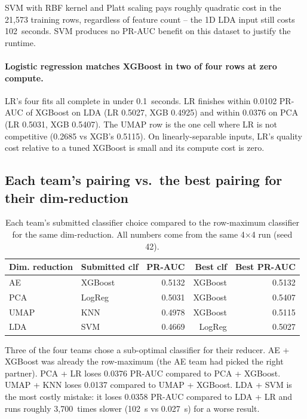 \documentclass[12pt,a4paper]{article}
\begin{document}
SVM with RBF kernel and Platt scaling pays roughly quadratic cost in the
21{,}573 training rows, regardless of feature count -- the 1D LDA input
still costs 102~seconds. SVM produces no PR-AUC benefit on this dataset to
justify the runtime.

\paragraph{Logistic regression matches XGBoost in two of four rows at zero compute.}
LR's four fits all complete in under 0.1~seconds. LR finishes within 0.0102
PR-AUC of XGBoost on LDA (LR 0.5027, XGB 0.4925) and within 0.0376 on PCA
(LR 0.5031, XGB 0.5407). The UMAP row is the one cell where LR is not
competitive (0.2685 vs XGB's 0.5115). On linearly-separable inputs, LR's
quality cost relative to a tuned XGBoost is small and its compute cost is
zero.

\subsection{Each team's pairing vs.\ the best pairing for their dim-reduction}

\begin{table}[H]
\centering
\caption{Each team's submitted classifier choice compared to the
         row-maximum classifier for the same dim-reduction. All numbers
         come from the same 4$\times$4 run (seed 42).}
\label{tab:team_pairings}
\small
\begin{tabular}{llrrr}
\toprule
Dim. reduction & Submitted clf & PR-AUC & Best clf & Best PR-AUC \\
\midrule
AE   & XGBoost & 0.5132 & XGBoost & 0.5132 \\
PCA  & LogReg  & 0.5031 & XGBoost & 0.5407 \\
UMAP & KNN     & 0.4978 & XGBoost & 0.5115 \\
LDA  & SVM     & 0.4669 & LogReg  & 0.5027 \\
\bottomrule
\end{tabular}
\end{table}

Three of the four teams chose a sub-optimal classifier for their reducer.
AE + XGBoost was already the row-maximum (the AE team had picked the right
partner). PCA + LR loses 0.0376 PR-AUC compared to PCA + XGBoost. UMAP +
KNN loses 0.0137 compared to UMAP + XGBoost. LDA + SVM is the most
costly mistake: it loses 0.0358 PR-AUC compared to LDA + LR and runs
roughly 3{,}700~times slower (102~s vs 0.027~s) for a worse result.
\end{document}
